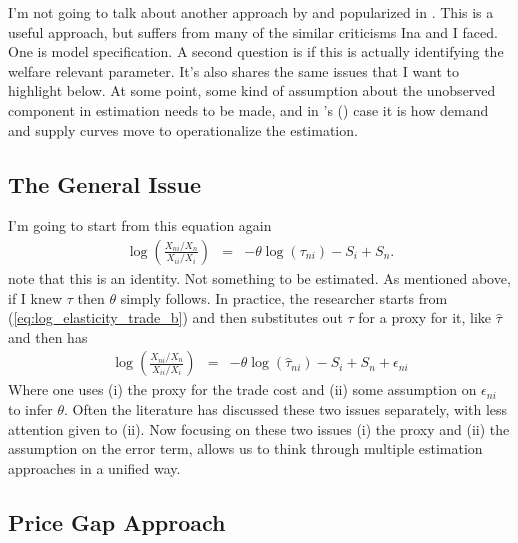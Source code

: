 \documentclass[pdftex,12pt]{article}
\def\citeapos#1{\citeauthor{#1}'s (\citeyear{#1})}
\begin{document}
I'm not going to talk about another approach by \citet{feenstra1994} and popularized in \citet{broda2006globalization}. This is a useful approach, but suffers from many of the similar criticisms Ina and I faced. One is model specification. A second question is if this is actually identifying the welfare relevant parameter. It's also shares the same issues that I want to highlight below. At some point, some kind of assumption about the unobserved component in estimation needs to be made, and in \citeapos{feenstra1994} case it is how demand and supply curves move to operationalize the estimation.

\subsection{The General Issue}

I'm going to start from this equation again
\begin{eqnarray}
\displaystyle \log\left(\frac{X_{ni}/X_n}{X_{ii}/X_i}\right)&=&-\theta \log\left(\tau_{ni}\right) -  S_i +  S_n.
\label{eq:log_elasticity_trade_b}
\end{eqnarray}
note that this is an identity. Not something to be estimated. As mentioned above, if I knew $\tau$ then $\theta$ simply follows. In practice, the researcher starts from (\ref{eq:log_elasticity_trade_b}) and then substitutes out $\tau$ for a proxy for it, like $\hat \tau$ and then has
\begin{eqnarray}
\displaystyle \log\left(\frac{X_{ni}/X_n}{X_{ii}/X_i}\right)&=&-\theta \log\left(\hat \tau_{ni}\right) -  S_i +  S_n + \epsilon_{ni}
\label{eq:log_elasticity_trade_c}
\end{eqnarray}
Where one uses (i) the proxy for the trade cost and (ii) some assumption on $\epsilon_{ni}$ to infer $\theta$. Often the literature has discussed these two issues separately, with less attention given to (ii). Now focusing on these two issues (i) the proxy and (ii) the assumption on the error term, allows us to think through multiple estimation approaches in a unified way.

\subsection{Price Gap Approach}
\end{document}
